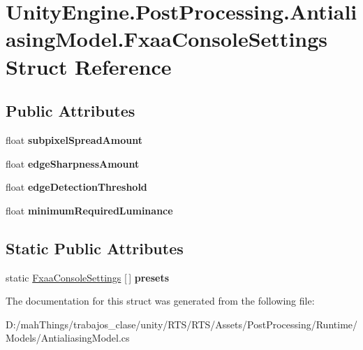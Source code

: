 \hypertarget{struct_unity_engine_1_1_post_processing_1_1_antialiasing_model_1_1_fxaa_console_settings}{}\section{Unity\+Engine.\+Post\+Processing.\+Antialiasing\+Model.\+Fxaa\+Console\+Settings Struct Reference}
\label{struct_unity_engine_1_1_post_processing_1_1_antialiasing_model_1_1_fxaa_console_settings}
\subsection*{Public Attributes}
\begin{DoxyCompactItemize}
\item 
\mbox{\label{struct_unity_engine_1_1_post_processing_1_1_antialiasing_model_1_1_fxaa_console_settings_a62f92a7785b3852cd58a0b30388b5694}} 
float {\bfseries subpixel\+Spread\+Amount}
\item 
\mbox{\label{struct_unity_engine_1_1_post_processing_1_1_antialiasing_model_1_1_fxaa_console_settings_a936bf87fcddf7c1a744c14e58c8e3fec}} 
float {\bfseries edge\+Sharpness\+Amount}
\item 
\mbox{\label{struct_unity_engine_1_1_post_processing_1_1_antialiasing_model_1_1_fxaa_console_settings_aa2c6e96f122692f59b48a1259aab595d}} 
float {\bfseries edge\+Detection\+Threshold}
\item 
\mbox{\label{struct_unity_engine_1_1_post_processing_1_1_antialiasing_model_1_1_fxaa_console_settings_a1ab7378c63a8f03d5bca7e93ed6dcdf6}} 
float {\bfseries minimum\+Required\+Luminance}
\end{DoxyCompactItemize}
\subsection*{Static Public Attributes}
\begin{DoxyCompactItemize}
\item 
\mbox{\label{struct_unity_engine_1_1_post_processing_1_1_antialiasing_model_1_1_fxaa_console_settings_a9b6cc245d52f7e835e731723bb678e01}} 
static \mbox{\hyperlink{struct_unity_engine_1_1_post_processing_1_1_antialiasing_model_1_1_fxaa_console_settings}{Fxaa\+Console\+Settings}} \mbox{[}$\,$\mbox{]} {\bfseries presets}
\end{DoxyCompactItemize}


The documentation for this struct was generated from the following file\+:\begin{DoxyCompactItemize}
\item 
D\+:/mah\+Things/trabajos\+\_\+clase/unity/\+R\+T\+S/\+R\+T\+S/\+Assets/\+Post\+Processing/\+Runtime/\+Models/Antialiasing\+Model.\+cs\end{DoxyCompactItemize}
